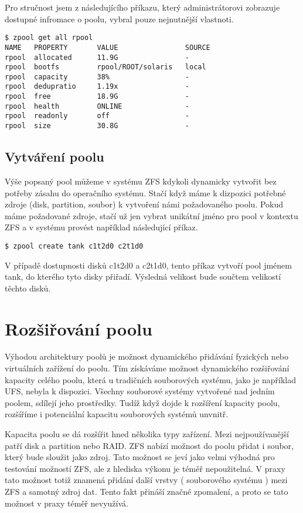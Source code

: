 Pro stručnost jsem z následujícího příkazu, který administrátorovi zobrazuje dostupné infromace o poolu, vybral pouze nejnutnější vlastnoti.
\begin{verbatim}
$ zpool get all rpool
NAME   PROPERTY       VALUE                SOURCE
rpool  allocated      11.9G                -
rpool  bootfs         rpool/ROOT/solaris   local
rpool  capacity       38%                  -
rpool  dedupratio     1.19x                -
rpool  free           18.9G                -
rpool  health         ONLINE               -
rpool  readonly       off                  -
rpool  size           30.8G                -
\end{verbatim}
\subsection{Vytváření poolu}
Výše popsaný pool můžeme v systému ZFS kdykoli dynamicky vytvořit bez potřeby zásahu do operačního systému. Stačí když máme k dizpozici potřebné zdroje (disk, partition, soubor) k vytvoření námi požadovaného poolu. Pokud máme požadované zdroje, stačí už jen vybrat unikátní jméno pro pool v kontextu ZFS a v systému provést například následující příkaz.
\begin{verbatim}
$ zpool create tank c1t2d0 c2t1d0
\end{verbatim}
V případě dostupnosti disků c1t2d0 a c2t1d0, tento příkaz vytvoří pool jménem tank, do kterého tyto disky přiřadí. Výsledná velikost bude součtem velikostí těchto disků.
\section{Rozšiřování poolu}
Výhodou architektury poolů je možnost dynamického přidávání fyzických nebo virtuálních zařížení do poolu. Tím získáváme možnost dynamického rozšiřování kapacity celého poolu, která u tradičních souborových systému, jako je například UFS, nebyla k dispozici. Všechny souborové systémy vytvořené nad jedním poolem, sdílejí jeho prostředky. Tudíž když dojde k rozšíření kapacity poolu, rozšíříme i potenciální kapacitu souborových systémů unvnitř.

Kapacita poolu se dá rozšířit hned několika typy zařízení. Mezi nejpoužívanější patří disk a partition nebo RAID. ZFS nabízí možnost do poolu přidat i soubor, který bude sloužit jako zdroj. Tato možnost se jeví jako velmi výhodná pro testování možností ZFS, ale z hlediska výkonu je téměř nepoužitelná. V praxy tato možnost totiž znamená přidání další
vrstvy ( souborového systému ) mezi ZFS a samotný zdroj dat. Tento fakt přináší značné zpomalení, a proto se tato možnost v praxy téměř nevyužívá.

